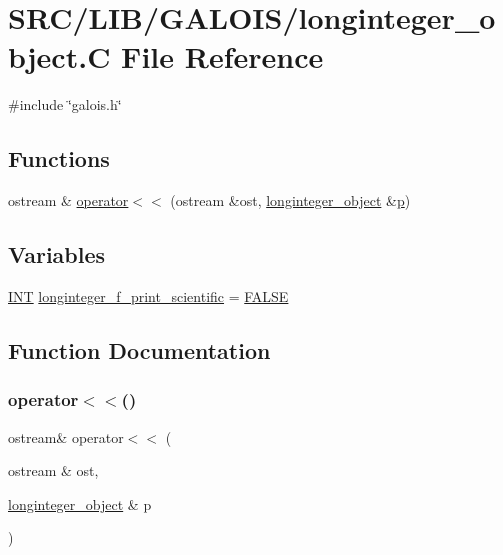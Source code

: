 \hypertarget{longinteger__object_8_c}{}\section{S\+R\+C/\+L\+I\+B/\+G\+A\+L\+O\+I\+S/longinteger\+\_\+object.C File Reference}
\label{longinteger__object_8_c}
{\ttfamily \#include \char`\"{}galois.\+h\char`\"{}}\newline
\subsection*{Functions}
\begin{DoxyCompactItemize}
\item 
ostream \& \mbox{\hyperlink{longinteger__object_8_c_a2d75190c2a04177840e33e0f6dea097c}{operator$<$$<$}} (ostream \&ost, \mbox{\hyperlink{classlonginteger__object}{longinteger\+\_\+object}} \&\mbox{\hyperlink{alphabet2_8_c_a533391314665d6bf1b5575e9a9cd8552}{p}})
\end{DoxyCompactItemize}
\subsection*{Variables}
\begin{DoxyCompactItemize}
\item 
\mbox{\hyperlink{galois_8h_a09fddde158a3a20bd2dcadb609de11dc}{I\+NT}} \mbox{\hyperlink{longinteger__object_8_c_aa1f8524fa9283e4ec8fb9c979c57654d}{longinteger\+\_\+f\+\_\+print\+\_\+scientific}} = \mbox{\hyperlink{nauty_8h_aa93f0eb578d23995850d61f7d61c55c1}{F\+A\+L\+SE}}
\end{DoxyCompactItemize}


\subsection{Function Documentation}
\mbox{\label{longinteger__object_8_c_a2d75190c2a04177840e33e0f6dea097c}} 
\subsubsection{\texorpdfstring{operator$<$$<$()}{operator<<()}}
{\footnotesize\ttfamily ostream\& operator$<$$<$ (\begin{DoxyParamCaption}\item[{ostream \&}]{ost,  }\item[{\mbox{\hyperlink{classlonginteger__object}{longinteger\+\_\+object}} \&}]{p }\end{DoxyParamCaption})}



